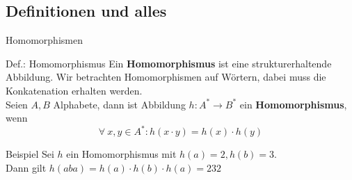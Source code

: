 
	

\subsection{Definitionen und alles}
\begin{frame}{Homomorphismen}
	\begin{block}{Def.: Homomorphismus}
		Ein \textbf{Homomorphismus} ist eine strukturerhaltende Abbildung. Wir betrachten Homomorphismen auf Wörtern, dabei muss die Konkatenation erhalten werden.\\
		Seien $A, B$ Alphabete, dann ist Abbildung $h: A^* \to B^*$ ein \textbf{Homomorphismus}, wenn
		$$ \forall\ x, y\in A^* : h(x \cdot y) = h(x) \cdot h(y) $$
	\end{block}
	
	\begin{exampleblock}{Beispiel}
		Sei $h$ ein Homomorphismus mit $h(a) = 2, h(b) = 3$. \\
		Dann gilt $h(aba) = h(a) \cdot h(b) \cdot h(a) = 232 $
	\end{exampleblock}
\end{frame}

